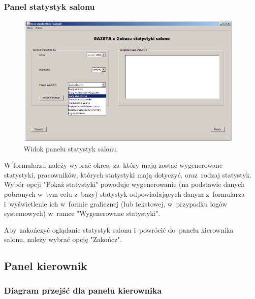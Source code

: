 \subsubsection{Panel statystyk salonu}
\begin{figure}
\includegraphics[width=1\textwidth]{gfx/stat_salonu.png}
\caption{Widok panelu statystyk salonu}
\end{figure}
W formularzu należy wybrać okres, za~który mają zostać wygenerowane statystyki, pracowników, których statystyki mają dotyczyć, oraz~rodzaj statystyk. Wybór opcji "Pokaż statystyki" powoduje wygenerowanie (na podstawie danych pobranych w~tym celu z~bazy) statystyk odpowiadających danym z~formularza i~wyświetlenie ich w~formie graficznej (lub tekstowej, w~przypadku logów systemowych) w~ramce "Wygenerowane statystyki".

Aby~zakończyć oglądanie statystyk salonu i~powrócić do~panelu kierownika salonu, należy wybrać opcję "Zakończ".
\subsection{Panel kierownik}
\subsubsection{Diagram przejść dla panelu kierownika}
